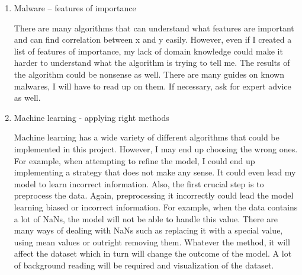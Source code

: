 \documentclass[11pt]{article}
\begin{document}
\begin{enumerate}
\begin{enumerate}
    \item{Malware – features of importance}

    There are many algorithms that can understand what features are important and can find correlation between x and y easily. However, even if I created a list of features of importance, my lack of domain knowledge could make it harder to understand what the algorithm is trying to tell me. The results of the algorithm could be nonsense as well. There are many guides on known malwares, I will have to read up on them. If necessary, ask for expert advice as well.
  
    \item{Machine learning - applying right methods}

    Machine learning has a wide variety of different algorithms that could be implemented in this project. However, I may end up choosing the wrong ones. For example, when attempting to refine the model, I could end up implementing a strategy that does not make any sense. It could even lead my model to learn incorrect information.
Also, the first crucial step is to preprocess the data. Again, preprocessing it incorrectly could lead the model learning biased or incorrect information. For example, when the data contains a lot of NaNs, the model will not be able to handle this value. There are many ways of dealing with NaNs such as replacing it with a special value, using mean values or outright removing them. Whatever the method, it will affect the dataset which in turn will change the outcome of the model. A lot of background reading will be required and visualization of the dataset.
  

  \end{enumerate}



\end{enumerate}








\newpage


\end{document}
